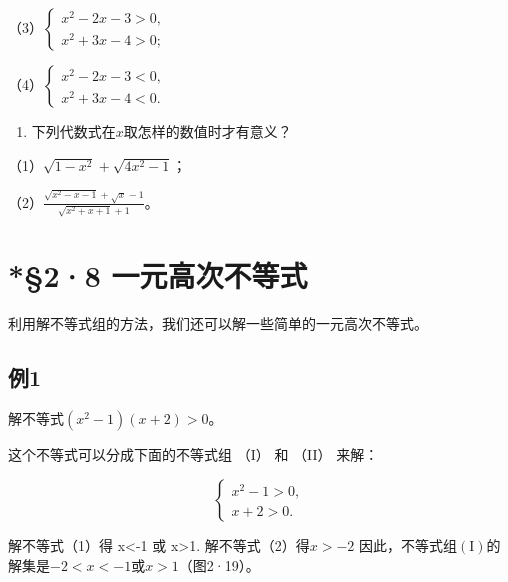 （3）\(\left\{ \begin{array}{l} x^{2} - 2x - 3 > 0, \\ x^{2} + 3x - 4 > 0; \end{array} \right.\)

（4）\(\left\{ \begin{array}{l} x^{2}-2x-3<0, \\ x^{2} + 3x - 4 < 0. \end{array} \right.\)

\begin{enumerate}[start=2]
\item
  下列代数式在\(x\)取怎样的数值时才有意义？
\end{enumerate}

（1）\(\sqrt{1 - x^2} + \sqrt{4x^2 - 1}\)；

（2）\(\frac{\sqrt{x^2 - x - 1} + \sqrt{x} - 1}{\sqrt{x^2 + x + 1} + 1}\)。

\section{*§2·8 一元高次不等式}

利用解不等式组的方法，我们还可以解一些简单的一元高次不等式。

\subsection{例1}

解不等式\((x^{2}-1)(x+2)>0\)。

 这个不等式可以分成下面的不等式组 （I） 和 （II） 来解：

\[
\left\{ \begin{array}{l} x^{2}-1 > 0, \\ x + 2 > 0. \end{array} \right. \tag {1}
\]

解不等式（1）得 x\textless-1 或 x\textgreater1.
解不等式（2）得\(x > -2\)
因此，不等式组\((\mathrm{I})\)的解集是\(-2 < x < -1\)或\(x > 1\)（图2·19）。

